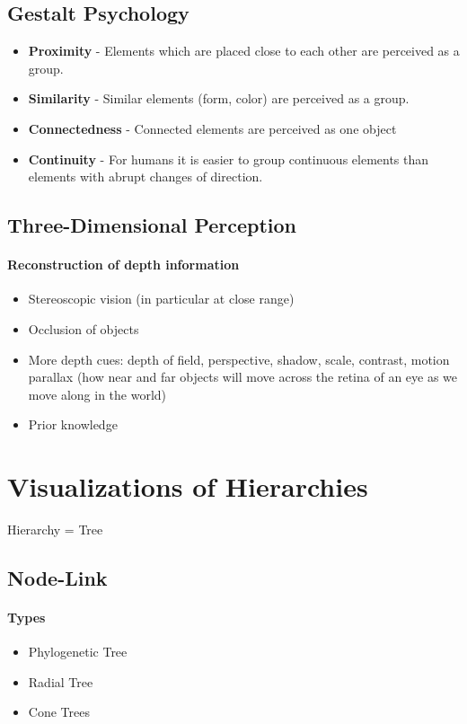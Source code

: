 \documentclass[10pt,a4paper]{article}
\begin{document}
	\subsection{Gestalt Psychology}
	\begin{itemize}
		\item \textbf{Proximity} - Elements which are placed close to each other are perceived as a group.
		\item \textbf{Similarity} - Similar elements (form, color) are perceived as a group.
		\item \textbf{Connectedness} - Connected elements are perceived as one object
		\item \textbf{Continuity} - For humans it is easier to group continuous elements than elements with abrupt changes of direction.
	\end{itemize}

	\subsection{Three-Dimensional Perception}
		\paragraph{Reconstruction of depth information}
		\begin{itemize}
			\item Stereoscopic vision (in particular at close range)
			\item Occlusion of objects
			\item More depth cues: depth of field, perspective, shadow, scale, contrast, motion parallax (how near and far objects will move across the retina of an eye as we move along in the world)
			\item Prior knowledge
		\end{itemize}
	
\section{Visualizations of Hierarchies}
	Hierarchy = Tree
	\subsection{Node-Link}
		\paragraph{Types}
		\begin{itemize}
			\item Phylogenetic Tree
			\item Radial Tree
			\item Cone Trees
		\end{itemize}
\end{document}
